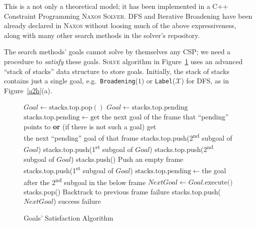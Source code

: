 \documentclass{ws-ijait}
\begin{document}
This is a not only a theoretical model; it has been
implemented in a C++ Constraint Programming \textsc{Naxos
Solver}. DFS and Iterative Broadening have been already
declared in \textsc{Naxos} without loosing much of the above
expressiveness, along with many other search methods in the
solver's repository.\cite{Naxos}

The search methods' goals cannot solve by themselves any
CSP; we need a procedure to \emph{satisfy} these goals.
\textsc{Solve} algorithm in Figure~\ref{solve} uses an
advanced ``stack of stacks'' data structure to store goals.
Initially, the stack of stacks contains just a single goal,
e.g.\ \texttt{Broadening}($1$) or
\texttt{Label}($\mathscr{X}$) for DFS, as in
Figure~\ref{a2h}(a).

\begin{figure}
  \centering
  \begin{algorithmic}
          \State $\mathit{Goal} \gets
                  \mathrm{stacks.top.pop()}$
        \Else
          \State $\mathit{Goal} \gets
                  \mathrm{stacks.top.pending}$
          \State $\mathrm{stacks.top.pending} \gets
                 \textrm{get}$ the next goal of the frame
                 that ``pending'' \\ \hspace*{14em} points
                 to \textbf{or} (if there is not such a
                 goal) get \\ \hspace*{14em} the next
                 ``pending'' goal of that frame
        \EndIf
          \State stacks.top.push(2\textsuperscript{nd}
                 subgoal of $\mathit{Goal}$)
          \State stacks.top.push(1\textsuperscript{st}
                 subgoal of $\mathit{Goal}$)
          \State stacks.top.push(2\textsuperscript{nd}
                 subgoal of $\mathit{Goal}$)
          \State stacks.push() \Comment Push an empty frame
          \State stacks.top.push(1\textsuperscript{st}
                 subgoal of $\mathit{Goal}$)
          \State $\mathrm{stacks.top.pending} \gets
                 \textrm{the}$ goal after the
                 2\textsuperscript{nd} subgoal in the below
                 frame
        \Else
          \State $\mathit{NextGoal} \gets
                  \mathit{Goal}\textrm{.execute()}$
            \State stacks.pop()
            \Comment Backtrack to previous frame
              \State \Return failure
            \EndIf
            \State stacks.top.push($\mathit{NextGoal}$)
            \State \Return success
          \EndIf
        \EndIf
      \EndWhile
      \State \Return failure
    \EndFunction
  \end{algorithmic}
  \caption{Goals' Satisfaction Algorithm\label{solve}}
\end{figure}
\end{document}
